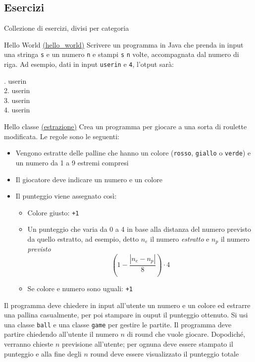 \subsection{Esercizi}
Collezione di esercizi, divisi per categoria
\begin{esercizio}{Hello World \href{run:./files/java/esercizi/hello_world/}{(hello\_world)}}
	Scrivere un programma in Java che prenda in input una stringa \verb|s| e un numero \verb|n| e stampi \verb|s| \verb|n| volte, accompagnata dal numero di riga. Ad esempio, dati in input \verb|userin| e \verb|4|, l'otput sarà:
	\begin{center}
		. userin\\
		2. userin\\
		3. userin\\
		4. userin
	\end{center}
\end{esercizio}
\begin{esercizio}{Hello classe \href{run:./files/java/esercizi/estrazione/}{(estrazione)}}
	Crea un programma per giocare a una sorta di roulette modificata. Le regole sono le seguenti:
	\begin{itemize}
		\item Vengono estratte delle palline che hanno un colore (\verb|rosso|,  \verb|giallo| o \verb|verde|) e un numero da 1 a 9 estremi compresi
		\item Il giocatore deve indicare un numero e un colore
		\item Il punteggio viene assegnato così:
		      \begin{itemize}
			      \item Colore giusto: \verb|+1|
			      \item Un punteggio che varia da 0 a 4 in base alla distanza del numero previsto da quello estratto, ad esempio, detto $ n_e $ il numero \textit{estratto} e  $ n_p $ il numero \textit{previsto}
			            \[
				            \left(1 - \frac{\left|n_e - n_p\right|}{8}\right) \cdot 4
			            \]
			      \item Se colore e numero sono uguali: \verb|+1|
		      \end{itemize}
	\end{itemize}
	Il programma deve chiedere in input all'utente un numero e un colore ed estrarre una pallina casualmente, per poi stampare in ouput il punteggio ottenuto. Si usi una classe \verb|ball| e una classe \verb|game| per gestire le partite.
	\vskip3mm
	Il programma deve partire chiedendo all'utente il numero $ n $ di round che vuole giocare. Dopodiché, verranno chieste $ n $ previsione all'utente; per ognuna deve essere stampato il punteggio e alla fine degli $ n $ round deve essere visualizzato il punteggio totale
\end{esercizio}

